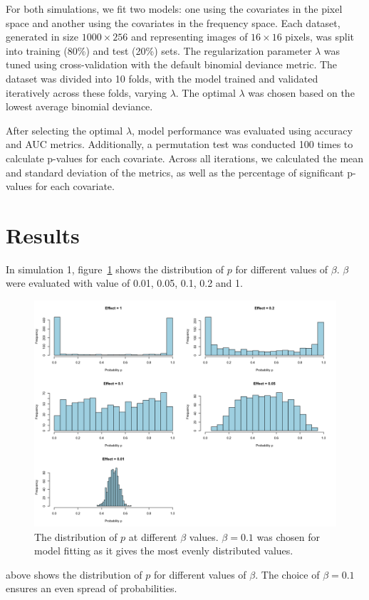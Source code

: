 \documentclass[12pt]{article}
\begin{document}
For both simulations, we fit two models: one using the covariates in the pixel
space and another using the covariates in the frequency space. Each dataset,
generated in size \( 1000 \times 256 \) and representing images of \( 16 \times
16 \) pixels, was split into training (80\%) and test (20\%) sets. The
regularization parameter \( \lambda \) was tuned using cross-validation with
the default binomial deviance metric. The dataset was divided into 10 folds,
with the model trained and validated iteratively across these folds, varying \(
\lambda \). The optimal \( \lambda \) was chosen based on the lowest average
binomial deviance.

After selecting the optimal \( \lambda \), model performance was evaluated
using accuracy and AUC metrics. Additionally, a permutation test was conducted
100 times to calculate p-values for each covariate. Across all iterations, we
calculated the mean and standard deviation of the metrics, as well as the
percentage of significant p-values for each covariate.

\section*{Results}

In simulation 1, figure~\ref{fig:sim1_p_dist} shows the distribution of 
\( p \) for different values of \( \beta	\). \( \beta \) were evaluated with
value of 0.01, 0.05, 0.1, 0.2 and 1. 

\begin{figure}[H] 
	\centering
	\includegraphics[width=\textwidth]{../Figures/sim1_p_dist.png} 
	\caption{The distribution of \(p\) at different \(\beta\) values. \(\beta = 0.1\) was
chosen for model fitting as it gives the most evenly distributed values.}
	\label{fig:sim1_p_dist} 
\end{figure}

above shows the distribution of \(p\) for
different values of \(\beta\). The choice of \(\beta = 0.1\) ensures an even
spread of probabilities.
\end{document}
